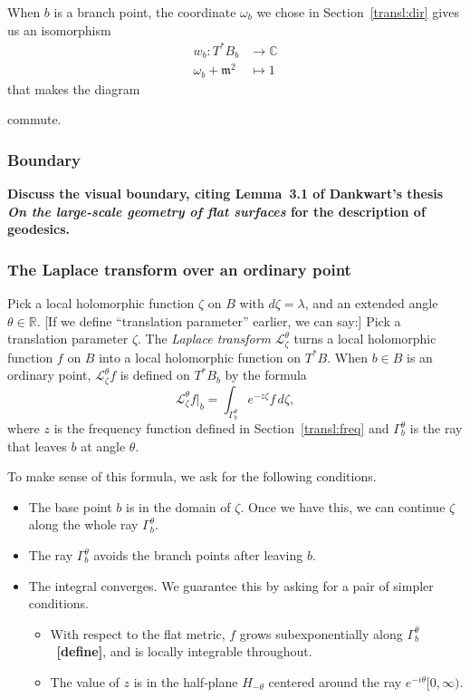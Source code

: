 \documentclass{article}
\theoremstyle{definition}
\newcommand{\maps}{\colon}
\newcommand{\R}{\mathbb{R}}
\newcommand{\C}{\mathbb{C}}
\newcommand{\blankbox}{{\fboxsep 0pt \colorbox{lightgray}{\phantom{$h$}}}}
\newcommand{\van}{\mathfrak{m}}
\newcommand{\laplace}{\mathcal{L}}
\begin{document}
When $b$ is a branch point, the coordinate $\omega_b$ we chose in Section~\ref{transl:dir} gives us an isomorphism
\begin{align*}
w_b \maps T^*B_b & \to \C \\
\omega_b + \van^2 & \mapsto 1
\end{align*}
that makes the diagram
\begin{center}
\end{center}
commute.
\subsubsection{Boundary}
\textbf{Discuss the visual boundary, citing Lemma~3.1 of Dankwart's thesis \textit{On the large-scale geometry of flat surfaces} for the description of geodesics.}

\subsubsection{The Laplace transform over an ordinary point}%
Pick a local holomorphic function $\zeta$ on $B$ with $d\zeta = \lambda$, and an extended angle $\theta \in \R$. \textcolor{VioletRed}{[If we define ``translation parameter'' earlier, we can say:] Pick a translation parameter $\zeta$.} The {\em Laplace transform} $\laplace_\zeta^\theta$ turns a local holomorphic function $f$ on $B$ into a local holomorphic function on $T^*B$. When $b \in B$ is an ordinary point, $\laplace_\zeta^\theta f$ is defined on $T^*B_b$ by the formula
\begin{equation}\label{laplace:int}
\laplace_\zeta^\theta f\big|_b = \int_{\Gamma_b^\theta} e^{-z\zeta} f\,d\zeta,
\end{equation}
where $z$ is the frequency function defined in Section~\ref{transl:freq} and $\Gamma_b^\theta$ is the ray that leaves $b$ at angle $\theta$.

To make sense of this formula, we ask for the following conditions.
\begin{itemize}
\item The base point $b$ is in the domain of $\zeta$. Once we have this, we can continue $\zeta$ along the whole ray $\Gamma_b^\theta$.
\item The ray $\Gamma_b^\theta$ avoids the branch points after leaving $b$.
\item The integral converges. We guarantee this by asking for a pair of simpler conditions.
\begin{itemize}
\item With respect to the flat metric, $f$ grows subexponentially along $\Gamma_b^\theta$~\textbf{[define]}, and is locally integrable throughout.
\item The value of $z$ is in the half-plane $H_{-\theta}$ centered around the ray $e^{-i\theta} [0, \infty)$.
\end{itemize}
\end{itemize}
\end{document}
